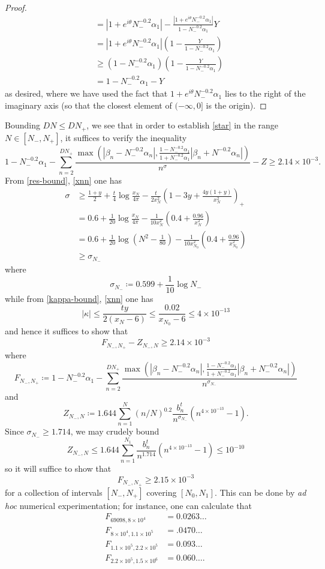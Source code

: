 \documentclass[a4paper,11pt,twoside]{amsart}
\begin{document}
\begin{proof}
\begin{align*}
&= |1 + e^{i\theta} N_-^{-0.2} \alpha_1| - \frac{|1+e^{i\theta} N_-^{-0.2} \alpha_1|}{1-N_-^{-0.2} \alpha_1} Y  \\
&= |1 + e^{i\theta} N_-^{-0.2} \alpha_1| \left(1 - \frac{Y}{1-N_-^{-0.2} \alpha_1} \right) \\
&\geq (1-N_-^{-0.2} \alpha_1) \left(1 - \frac{Y}{1-N_-^{-0.2} \alpha_1} \right) \\
&= 1 - N_-^{-0.2} \alpha_1 - Y
\end{align*}
as desired, where we have used the fact that $1+e^{i\theta} N_-^{-0.2} \alpha_1$ lies to the right of the imaginary axis (so that the closest element of $(-\infty,0]$ is the origin).
\end{proof}

Bounding $DN \leq DN_+$, we see that in order to establish \eqref{star} in the range $N \in [N_-, N_+]$, it suffices to verify the inequality
$$ 1 - N_-^{-0.2} \alpha_1 - \sum_{n=2}^{DN_+} \frac{\max(|\beta_n-N_-^{-0.2} \alpha_n|, \frac{1-N_-^{-0.2} \alpha_1}{1+N_-^{-0.2} \alpha_1} |\beta_n+N^{-0.2} \alpha_n|)}{n^{\sigma}} - Z
\geq 2.14 \times 10^{-3}.$$
From \eqref{res-bound}, \eqref{xnn} one has 
\begin{align*}
 \sigma &\geq \frac{1+y}{2} +\frac{t}{4} \log \frac{x_N}{4\pi} - \frac{t}{2x_N^2} \left(1-3y+\frac{4y(1+y)}{x_N^2}\right)_+ \\
&= 0.6 + \frac{1}{20} \log \frac{x_N}{4\pi} - \frac{1}{10 x_N^2} \left( 0.4 + \frac{0.96}{x_N^2} \right) \\
&= 0.6 + \frac{1}{20} \log (N^2 - \frac{1}{80}) - \frac{1}{10 x_{N_0}^2} \left( 0.4 + \frac{0.96}{x_{N_0}^2} \right) \\
&\geq \sigma_{N_-}
\end{align*}
where
$$ \sigma_{N_-} \coloneqq 0.599 + \frac{1}{10} \log N_- $$
while from \eqref{kappa-bound}, \eqref{xnn} one has
$$ |\kappa| \leq \frac{ty}{2(x_N-6)} \leq \frac{0.02}{x_{N_0}-6} \leq 4 \times 10^{-13}$$
and hence it suffices to show that
$$ F_{N_-,N_+} - Z_{N_-,N} \geq 2.14 \times 10^{-3}$$
where
$$ F_{N_-,N_+} \coloneqq 1 - N_-^{-0.2} \alpha_1 - \sum_{n=2}^{DN_+} \frac{\max(|\beta_n-N_-^{-0.2} \alpha_n|, \frac{1-N_-^{-0.2} \alpha_1}{1+N_-^{-0.2} \alpha_1} |\beta_n+N_-^{-0.2} \alpha_n|)}{n^{\sigma_{N_-}}}$$
and
$$ Z_{N_-,N} \coloneqq 1.644 \sum_{n=1}^N (n/N)^{0.2} \frac{b_n^t}{n^{\sigma_{N_-}}} (n^{4 \times 10^{-13}}-1).$$
Since $\sigma_{N_-} \geq 1.714$, we may crudely bound
$$ Z_{N_-,N} \leq 1.644 \sum_{n=1}^{N_1} \frac{b_n^t}{n^{1.714}} (n^{4 \times 10^{-13}}-1) \leq 10^{-10}$$
so it will suffice to show that
$$ F_{N_-,N_+} \geq 2.15 \times 10^{-3}$$
for a collection of intervals $[N_-,N_+]$ covering $[N_0, N_1]$.  This can be done by \emph{ad hoc} numerical experimentation; for instance, one can calculate that
\begin{align*}
F_{69098, 8 \times 10^4} &= 0.0263\dots \\
F_{8 \times 10^4, 1.1 \times 10^5} &= .0470\dots \\
F_{1.1 \times 10^5, 2.2 \times 10^5} &= 0.093\dots \\
F_{2.2 \times 10^5, 1.5 \times 10^6} &= 0.060\dots .
\end{align*}
\end{document}
